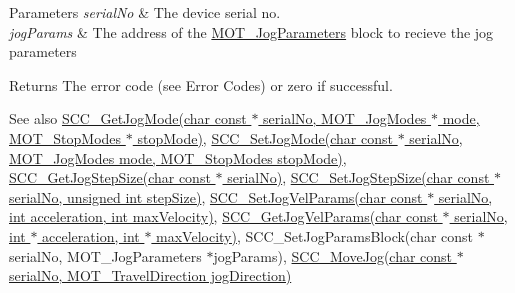 \begin{DoxyParams}{Parameters}
{\em serial\+No} & The device serial no. \\
\hline
{\em jog\+Params} & The address of the \hyperlink{struct_m_o_t___jog_parameters}{M\+O\+T\+\_\+\+Jog\+Parameters} block to recieve the jog parameters \\
\hline
\end{DoxyParams}
\begin{DoxyReturn}{Returns}
The error code (see Error Codes) or zero if successful. 
\end{DoxyReturn}
\begin{DoxySeeAlso}{See also}
\hyperlink{group___t_cube_stepper_ga2a46e3c180400d1387cb057cdf94c6c4}{S\+C\+C\+\_\+\+Get\+Jog\+Mode(char const $\ast$ serial\+No, M\+O\+T\+\_\+\+Jog\+Modes $\ast$ mode, M\+O\+T\+\_\+\+Stop\+Modes $\ast$ stop\+Mode)}, \hyperlink{group___t_cube_stepper_gae802a1cc2dbbc7c195707e7dc8edd7bc}{S\+C\+C\+\_\+\+Set\+Jog\+Mode(char const $\ast$ serial\+No, M\+O\+T\+\_\+\+Jog\+Modes mode, M\+O\+T\+\_\+\+Stop\+Modes stop\+Mode)}, \hyperlink{group___t_cube_stepper_gafddac4a09a4df4ec56756592559c2940}{S\+C\+C\+\_\+\+Get\+Jog\+Step\+Size(char const $\ast$ serial\+No)}, \hyperlink{group___t_cube_stepper_ga7ac0f4bd9b83c05a0ec6b7cf33b00ae2}{S\+C\+C\+\_\+\+Set\+Jog\+Step\+Size(char const $\ast$ serial\+No, unsigned int step\+Size)}, \hyperlink{group___t_cube_stepper_gabf0a72b1c8e1751bffeac150bfa2596a}{S\+C\+C\+\_\+\+Set\+Jog\+Vel\+Params(char const $\ast$ serial\+No, int acceleration, int max\+Velocity)}, \hyperlink{group___t_cube_stepper_gabdc0d8df25714517d6905c53a106f021}{S\+C\+C\+\_\+\+Get\+Jog\+Vel\+Params(char const $\ast$ serial\+No, int $\ast$ acceleration, int $\ast$ max\+Velocity)}, S\+C\+C\+\_\+\+Set\+Jog\+Params\+Block(char const $\ast$ serial\+No, M\+O\+T\+\_\+\+Jog\+Parameters $\ast$jog\+Params), \hyperlink{group___t_cube_stepper_ga76a2ed08c67a983a7ac58e5201cbb1c4}{S\+C\+C\+\_\+\+Move\+Jog(char const $\ast$ serial\+No, M\+O\+T\+\_\+\+Travel\+Direction jog\+Direction)}


\end{DoxySeeAlso}

\begin{DoxyCodeInclude}
\end{DoxyCodeInclude}
